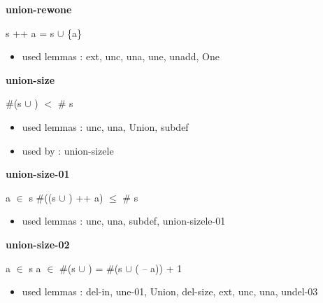 \documentclass[a4paper]{article}
\begin{document}
\medskip

\bigskip

{\large\bf union-rewone}

\medskip

 \Fol s ++ a = s $\cup$ \{a\}

\begin{itemize}


\item       used lemmas  : ext, unc, una, une, unadd, One

\end{itemize}

\medskip

\bigskip

{\large\bf union-size}

\medskip

 \Fol \Not \#(s $\cup$ ) $<$ \# s

\begin{itemize}


\item       used lemmas  : unc, una, Union, subdef
\item       used by      : union-sizele

\end{itemize}

\medskip

\bigskip

{\large\bf union-size-01}

\medskip

 \Fol \Not a $\in$ s \Imp \Not \#((s $\cup$ ) ++ a) $\le$ \# s

\begin{itemize}


\item       used lemmas  : unc, una, subdef, union-sizele-01

\end{itemize}

\medskip

\bigskip

{\large\bf union-size-02}

\medskip

 \Fol \Not a $\in$ s \And a $\in$  \Imp \#(s $\cup$ ) = \#(s $\cup$ ( -- a)) + 1

\begin{itemize}


\item       used lemmas  : del-in, une-01, Union, del-size, ext, unc, una, undel-03

\end{itemize}
\end{document}

